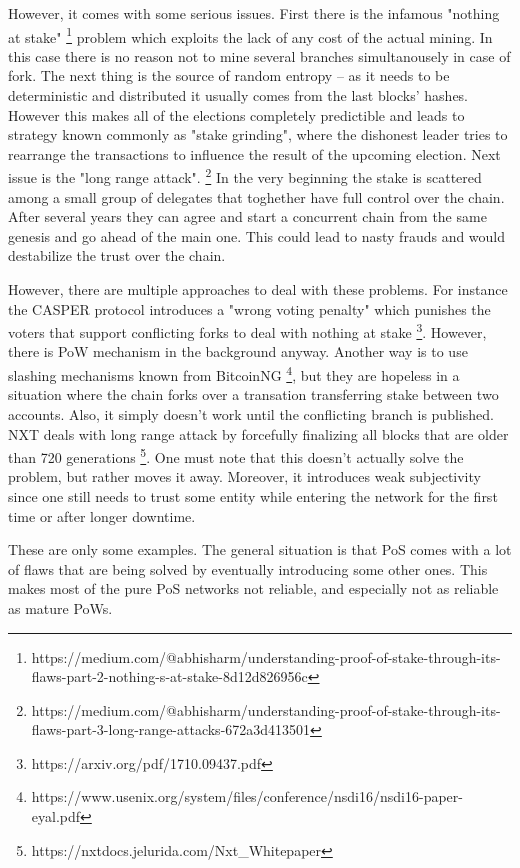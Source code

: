 However, it comes with some serious issues. First there is the infamous "nothing at stake"
\footnote{https://medium.com/@abhisharm/understanding-proof-of-stake-through-its-flaws-part-2-nothing-s-at-stake-8d12d826956c}
problem which exploits the lack of any cost of the actual mining. In this case
there is no reason not to mine several branches simultanousely in case of fork.
The next thing is the source of random entropy – as it needs to be deterministic
and distributed it usually comes from the last blocks' hashes. However this
makes all of the elections completely predictible and leads to strategy known
commonly as "stake grinding", where the dishonest leader tries to rearrange the
transactions to influence the result of the upcoming election. Next issue is the
"long range attack".
\footnote{https://medium.com/@abhisharm/understanding-proof-of-stake-through-its-flaws-part-3-long-range-attacks-672a3d413501}
In the very beginning the stake is scattered among a small
group of delegates that toghether have full control over the chain. After
several years they can agree and start a concurrent chain from the same genesis
and go ahead of the main one. This could lead to nasty frauds and would
destabilize the trust over the chain.

However, there are multiple approaches to deal with these problems. For instance
the CASPER protocol introduces a "wrong voting penalty" which punishes the
voters that support conflicting forks to deal with nothing at stake
\footnote{https://arxiv.org/pdf/1710.09437.pdf}.
However, there is PoW mechanism in the background anyway. Another way is to use
slashing mechanisms known from BitcoinNG
\footnote{https://www.usenix.org/system/files/conference/nsdi16/nsdi16-paper-eyal.pdf},
but they are hopeless in a situation where the chain forks over a transation
transferring stake between two accounts. Also, it simply doesn't work until the
conflicting branch is published. NXT deals with long range attack by forcefully
finalizing all blocks that are older than 720 generations
\footnote{https://nxtdocs.jelurida.com/Nxt\_Whitepaper}.
One must note that this doesn't actually solve the problem, but rather moves it
away. Moreover, it introduces weak subjectivity since one still needs to trust
some entity while entering the network for the first time or after longer downtime.

These are only some examples. The general situation is that PoS comes with a lot
of flaws that are being solved by eventually introducing some other ones. This
makes most of the pure PoS networks not reliable, and especially not as reliable
as mature PoWs.